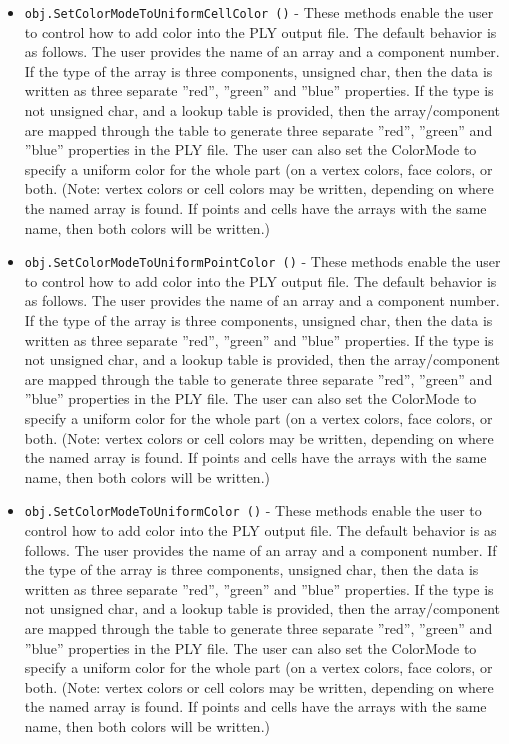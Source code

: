 \begin{itemize}
\item  \verb|obj.SetColorModeToUniformCellColor ()| -  These methods enable the user to control how to add color into the PLY
 output file. The default behavior is as follows. The user provides the
 name of an array and a component number. If the type of the array is
 three components, unsigned char, then the data is written as three
 separate ''red'', ''green'' and ''blue'' properties. If the type is not
 unsigned char, and a lookup table is provided, then the array/component
 are mapped through the table to generate three separate ''red'', ''green''
 and ''blue'' properties in the PLY file. The user can also set the
 ColorMode to specify a uniform color for the whole part (on a vertex
 colors, face colors, or both. (Note: vertex colors or cell colors may be
 written, depending on where the named array is found. If points and
 cells have the arrays with the same name, then both colors will be
 written.)

\item  \verb|obj.SetColorModeToUniformPointColor ()| -  These methods enable the user to control how to add color into the PLY
 output file. The default behavior is as follows. The user provides the
 name of an array and a component number. If the type of the array is
 three components, unsigned char, then the data is written as three
 separate ''red'', ''green'' and ''blue'' properties. If the type is not
 unsigned char, and a lookup table is provided, then the array/component
 are mapped through the table to generate three separate ''red'', ''green''
 and ''blue'' properties in the PLY file. The user can also set the
 ColorMode to specify a uniform color for the whole part (on a vertex
 colors, face colors, or both. (Note: vertex colors or cell colors may be
 written, depending on where the named array is found. If points and
 cells have the arrays with the same name, then both colors will be
 written.)

\item  \verb|obj.SetColorModeToUniformColor ()| -  These methods enable the user to control how to add color into the PLY
 output file. The default behavior is as follows. The user provides the
 name of an array and a component number. If the type of the array is
 three components, unsigned char, then the data is written as three
 separate ''red'', ''green'' and ''blue'' properties. If the type is not
 unsigned char, and a lookup table is provided, then the array/component
 are mapped through the table to generate three separate ''red'', ''green''
 and ''blue'' properties in the PLY file. The user can also set the
 ColorMode to specify a uniform color for the whole part (on a vertex
 colors, face colors, or both. (Note: vertex colors or cell colors may be
 written, depending on where the named array is found. If points and
 cells have the arrays with the same name, then both colors will be
 written.)


\end{itemize}

